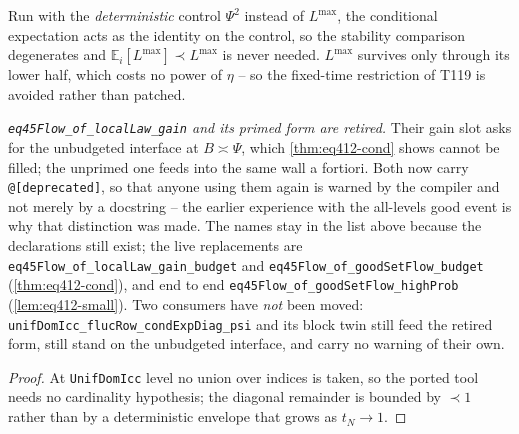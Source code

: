 \begin{lemma}\label{lem:condstableflow}
  \leanok{}
  Run with the \emph{deterministic} control $\Psi^2$ instead of $L^{\max}$, the conditional
  expectation acts as the identity on the control, so the stability comparison degenerates and
  $\mathbb E_i[L^{\max}]\prec L^{\max}$ is never needed. $L^{\max}$ survives only through its lower
  half, which costs no power of $\eta$ -- so the fixed-time restriction of T119 is avoided rather
  than patched.

  \emph{\texttt{eq45Flow\_of\_localLaw\_gain} and its primed form are retired.}  Their gain slot
  asks for the unbudgeted interface at $B\asymp\Psi$, which \ref{thm:eq412-cond} shows cannot be
  filled; the unprimed one feeds into the same wall a fortiori.  Both now carry
  \texttt{@[deprecated]}, so that anyone using them again is warned by the compiler and not merely
  by a docstring -- the earlier experience with the all-levels good event is why that distinction
  was made.  The names stay in the list above because the declarations still exist; the live
  replacements are \texttt{eq45Flow\_of\_localLaw\_gain\_budget} and
  \texttt{eq45Flow\_of\_goodSetFlow\_budget} (\ref{thm:eq412-cond}), and end to end
  \texttt{eq45Flow\_of\_goodSetFlow\_highProb} (\ref{lem:eq412-small}).  Two consumers have
  \emph{not} been moved: \texttt{unifDomIcc\_flucRow\_condExpDiag\_psi} and its block twin still
  feed the retired form, still stand on the unbudgeted interface, and carry no warning of their
  own.
\end{lemma}
\begin{proof}\leanok
  At \texttt{UnifDomIcc} level no union over indices is taken, so the ported tool needs no
  cardinality hypothesis; the diagonal remainder is bounded by $\prec1$ rather than by a
  deterministic envelope that grows as $t_N\to1$.
\end{proof}

